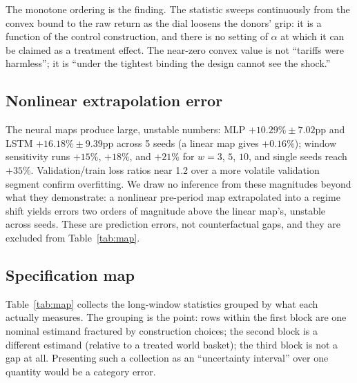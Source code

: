 \documentclass[11pt,a4paper]{article}
\begin{document}
The monotone ordering is the finding. The statistic sweeps continuously
from the convex bound to the raw return as the dial loosens the donors'
grip: it is a function of the control construction, and there is no
setting of $\alpha$ at which it can be claimed as a treatment effect. The
near-zero convex value is not ``tariffs were harmless''; it is ``under the
tightest binding the design cannot see the shock.''

\subsection{Nonlinear extrapolation error}\label{sec:dl}

The neural maps produce large, unstable numbers: MLP $+10.29\% \pm 7.02$pp
and LSTM $+16.18\% \pm 9.39$pp across 5 seeds (a linear map
gives $+0.16\%$); window sensitivity runs $+15\%$, $+18\%$, and $+21\%$
for $w=3$, $5$, $10$, and single seeds reach $+35\%$. Validation/train
loss ratios
near 1.2 over a more volatile validation segment confirm overfitting. We
draw no inference from these magnitudes beyond what they demonstrate: a
nonlinear pre-period map extrapolated into a regime shift yields errors
two orders of magnitude above the linear map's, unstable across seeds.
These are prediction errors, not counterfactual gaps, and they are
excluded from Table~\ref{tab:map}.

\subsection{Specification map}\label{sec:map}

Table~\ref{tab:map} collects the long-window statistics grouped by what
each actually measures. The grouping is the point: rows within the first
block are one nominal estimand fractured by construction choices; the
second block is a different estimand (relative to a treated world
basket); the third block is not a gap at all. Presenting such a
collection as an ``uncertainty interval'' over one quantity would be a
category error.
\end{document}
